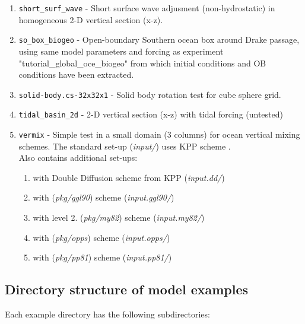 \begin{enumerate}
\item \texttt{short\_surf\_wave} - Short surface wave adjusment
   (non-hydrostatic) in homogeneous 2-D vertical section (x-z).

\item \texttt{so\_box\_biogeo} - Open-boundary Southern ocean box around
 Drake passage, using same model parameters and forcing as experiment
  "tutorial\_global\_oce\_biogeo" from which initial conditions
 and OB conditions have been extracted.

\item \texttt{solid-body.cs-32x32x1} - Solid body rotation test for cube
  sphere grid.

\item \texttt{tidal\_basin\_2d} - 2-D vertical section (x-z) with tidal forcing
 (untested)

\item \texttt{vermix} - Simple test in a small domain (3 columns) for
  ocean vertical mixing schemes. The standard set-up ({\it input/}) uses
  KPP scheme \cite[]{lar-eta:94}.\\
  Also contains additional set-ups:
  \begin{enumerate}
   \item with Double Diffusion scheme from KPP ({\it input.dd/})
   \item with \cite{gas-eta:90} ({\it pkg/ggl90}) scheme ({\it input.ggl90/})
   \item with \cite{Mellor:Yamada1982} level 2. ({\it pkg/my82}) scheme ({\it input.my82/})
   \item with \cite{pal-rom:97} ({\it pkg/opps}) scheme ({\it input.opps/})
   \item with \cite{Pacanowski:Philander1981} ({\it pkg/pp81}) scheme ({\it input.pp81/})
  \end{enumerate}

\end{enumerate}

\subsection{Directory structure of model examples}

Each example directory has the following subdirectories:

